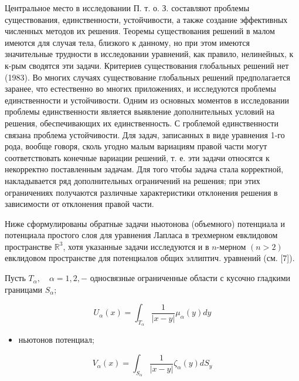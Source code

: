 \documentclass[10pt]{article}
\begin{document}
Центральное место в исследовании П. т. о. З. составляют проблемы существования, единственности, устойчивости, а также создание эффективных численных методов их решения. Теоремы существования решений в малом имеются для случая тела, близкого к данному, но при этом имеются значительные трудности в исследовании уравнений, как правило, нелинейных, к к-рым сводятся эти задачи. Критериев существования глобальных решений нет (1983). Во многих случаях существование глобальных решений предполагается заранее, что естественно во многих приложениях, и исследуются проблемы единственности и устойчивости. Одним из основных моментов в исследовании проблемы единственности является выявление дополнительных условий на решения, обеспечивающих их единственность. С гроблемой единственности связана проблема устойчивости. Для задач, записанных в виде уравнения 1-го рода, вообще говоря, сколь угодно малым вариациям правой части могут соответствовать конечные вариации решений, т. е. эти задачи относятся к некорректно поставленным задачам. Для того чтобы задача стала корректной, накладывается ряд дополнительных ограничений на решения; при этих ограничениях получаются различные характеристики отклонения решения в зависимости от отклонения правой части.



Ниже сформулированы обратные задачи ньютонова (объемного) потенциала и потенциала простого слоя для уравнения Лапласа в трехмерном евклидовом пространстве $\mathbb{R}^{3}$, хотя указанные задачи исследуются и в $n$-мерном $(n>2)$ евклидовом пространстве для потенциалов общих эллиптич. уравнений (см. [7]).



Пусть $T_{\alpha}, \quad \alpha=1,2,-$ односвязные ограниченные области с кусочно гладкими границами $S_{\alpha}$;



\[

U_{\alpha}(x)=\int_{T_{\alpha}} \frac{1}{|x-y|} \mu_{\alpha}(y) d y

\]



\begin{itemize}

  \item ньютонов потенциал;

\end{itemize}



\[

V_{\alpha}(x)=\int_{S_{\alpha}} \frac{1}{|x-y|} \zeta_{\alpha}(y) d S_{y}

\]
\end{document}
